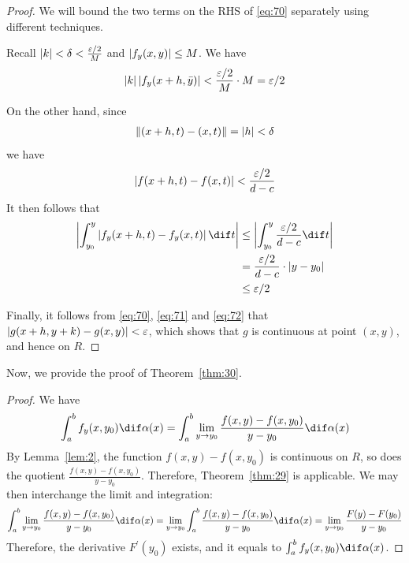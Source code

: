 \documentclass[thmcnt=section, color=blue, 12pt]{my-elegantbook}
\begin{document}
\begin{proof}
	We will bound the two terms on the RHS of \eqref{eq:70} separately
	using different techniques.


	Recall $\left\lvert k \right\rvert < \delta < \frac{\varepsilon / 2}{M}$
	and $\left\lvert f_y(x, y) \right\rvert \leq M$.
	We have
	\begin{align}
		\left\lvert k \right\rvert \left\lvert f_y(x+h, \bar{y}) \right\rvert
		< \frac{\varepsilon / 2}{M} \cdot M = \varepsilon / 2
		\label{eq:71}
	\end{align}

	On the other hand, since
	\begin{align*}
		\left\lVert (x+h, t) - (x, t) \right\rVert = \left\lvert h \right\rvert < \delta
	\end{align*}
	we have
	\begin{align*}
		\left\lvert f(x+h, t) - f(x, t) \right\rvert < \frac{\varepsilon / 2}{d - c}
	\end{align*}
	It then follows that
	\begin{align}
		\abs{ \int_{y_0}^y \abs{f_y(x+h, t) - f_y(x, t)} \dif t }
		 & \leq \abs{ \int_{y_0}^y \frac{\varepsilon / 2}{d - c} \dif t } \nonumber \\
		 & = \frac{\varepsilon / 2}{d - c} \cdot \abs{y - y_0}       \nonumber      \\
		 & \leq \varepsilon / 2
		\label{eq:72}
	\end{align}

	Finally, it follows from \eqref{eq:70}, \eqref{eq:71} and \eqref{eq:72}
	that $\left\lvert g(x+h, y+k) - g(x, y) \right\rvert < \varepsilon$,
	which shows that $g$ is continuous at point $(x, y)$, and hence on $R$.
\end{proof}

Now, we provide the proof of Theorem~\ref{thm:30}.

\begin{proof}
	We have
	\begin{align*}
		\int_a^b f_y(x, y_0) \dif \alpha(x)
		= \int_a^b \lim_{y \to y_0} \frac{f(x, y) - f(x, y_0)}{y - y_0} \dif \alpha(x)
	\end{align*}
	By Lemma~\ref{lem:2}, the function $f(x, y) - f(x, y_0)$ is continuous on $R$,
	so does the quotient $\frac{f(x, y) - f(x, y_0)}{y - y_0}$.
	Therefore, Theorem~\ref{thm:29} is applicable.
	We may then interchange the limit and integration:
	\begin{align*}
		\int_a^b \lim_{y \to y_0} \frac{f(x, y) - f(x, y_0)}{y - y_0} \dif \alpha(x)
		=  \lim_{y \to y_0} \int_a^b \frac{f(x, y) - f(x, y_0)}{y - y_0} \dif \alpha(x)
		=  \lim_{y \to y_0} \frac{F(y) - F(y_0)}{y - y_0}
	\end{align*}
	Therefore, the derivative $F^\prime(y_0)$ exists,
	and it equals to $\int_a^b f_y(x, y_0) \dif \alpha(x)$.
\end{proof}
\end{document}
